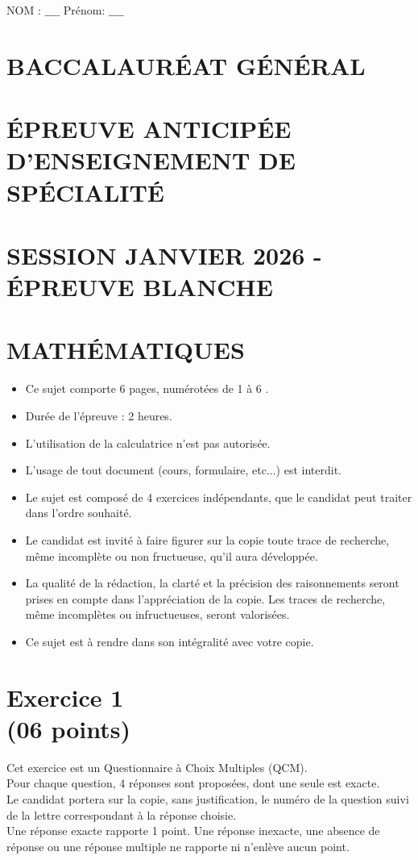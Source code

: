 \documentclass[10pt]{article}
\begin{document}
NOM : $\_\_\_\_$ Prénom: $\_\_\_\_$

\section*{BACCALAURÉAT GÉNÉRAL}
\section*{ÉPREUVE ANTICIPÉE D'ENSEIGNEMENT DE SPÉCIALITÉ}
\section*{SESSION JANVIER 2026 - ÉPREUVE BLANCHE}
\section*{MATHÉMATIQUES}
\begin{itemize}
  \item Ce sujet comporte 6 pages, numérotées de 1 à 6 .
  \item Durée de l'épreuve : 2 heures.
  \item L'utilisation de la calculatrice n'est pas autorisée.
  \item L'usage de tout document (cours, formulaire, etc...) est interdit.
  \item Le sujet est composé de 4 exercices indépendants, que le candidat peut traiter dans l'ordre souhaité.
  \item Le candidat est invité à faire figurer sur la copie toute trace de recherche, même incomplète ou non fructueuse, qu'il aura développée.
  \item La qualité de la rédaction, la clarté et la précision des raisonnements seront prises en compte dans l'appréciation de la copie. Les traces de recherche, même incomplètes ou infructueuses, seront valorisées.
  \item Ce sujet est à rendre dans son intégralité avec votre copie.
\end{itemize}

\section*{Exercice 1 \\
 (06 points)}
Cet exercice est un Questionnaire à Choix Multiples (QCM).\\
Pour chaque question, 4 réponses sont proposées, dont une seule est exacte.\\
Le candidat portera sur la copie, sans justification, le numéro de la question suivi de la lettre correspondant à la réponse choisie.\\
Une réponse exacte rapporte 1 point. Une réponse inexacte, une absence de réponse ou une réponse multiple ne rapporte ni n'enlève aucun point.
\end{document}

